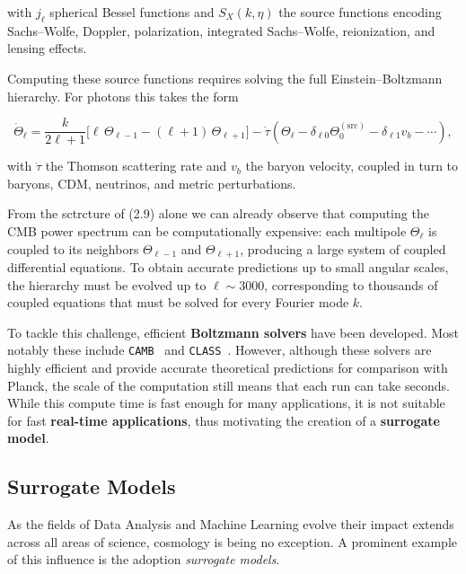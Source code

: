 \documentclass[11pt,a4paper]{article}
\numberwithin{equation}{section}
\begin{document}
with $j_\ell$ spherical Bessel functions and $S_X(k,\eta)$ the source functions encoding Sachs–Wolfe, Doppler, polarization, integrated Sachs–Wolfe, reionization, and lensing effects. 


Computing these source functions requires solving the full Einstein–Boltzmann hierarchy. For photons this takes the form

\begin{equation}
\dot\Theta_\ell = \frac{k}{2\ell+1}\big[\ell\,\Theta_{\ell-1} - (\ell+1)\,\Theta_{\ell+1}\big]
- \dot\tau\left(\Theta_\ell - \delta_{\ell 0}\Theta_0^{(\text{src})} - \delta_{\ell 1} v_b - \cdots\right),
\end{equation}

with $\dot\tau$ the Thomson scattering rate and $v_b$ the baryon velocity, coupled in turn to baryons, CDM, neutrinos, and metric perturbations. 

From the sctrcture of (2.9) alone we can already observe that computing the CMB power spectrum can be computationally expensive: each multipole $\Theta_\ell$ is coupled to its neighbors $\Theta_{\ell-1}$ and $\Theta_{\ell+1}$, producing a large system of coupled differential equations. To obtain accurate predictions up to small angular scales, the hierarchy must be evolved up to $\ell \sim 3000$, corresponding to thousands of coupled equations that must be solved for every Fourier mode $k$. 

To tackle this challenge, efficient \textbf{Boltzmann solvers} have been developed. Most notably these include \texttt{CAMB}~\cite{lewis2000} and \texttt{CLASS}~\cite{lesgourgues2011}. 
However, although these solvers are highly efficient and provide accurate theoretical predictions for comparison with Planck, the scale of the computation still means that each run can take seconds. 
While this compute time is fast enough for many applications, it is not suitable for fast \textbf{real-time applications}, thus motivating the creation of a \textbf{surrogate model}. 


\subsection{Surrogate Models}
\label{sec:surrogates}

As the fields of Data Analysis and Machine Learning evolve their impact extends across all areas of science, cosmology is being no exception. A prominent example of this influence is the adoption \textit{surrogate models}.
\end{document}
